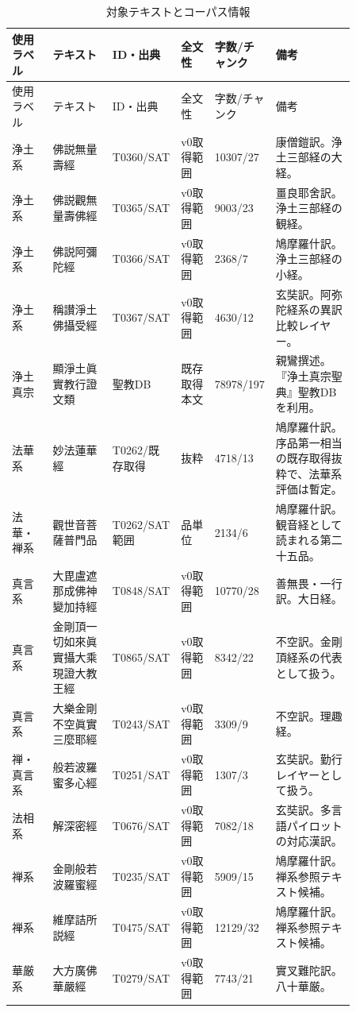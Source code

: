 \documentclass[uplatex,dvipdfmx,11pt,a4paper]{jsarticle}
\begin{document}
{\small
\setlength{\tabcolsep}{3pt}
\begin{longtable}{@{}p{0.12\linewidth}p{0.18\linewidth}p{0.12\linewidth}p{0.10\linewidth}p{0.10\linewidth}p{0.24\linewidth}@{}}
\caption{対象テキストとコーパス情報}\\
\toprule
使用ラベル & テキスト & ID・出典 & 全文性 & 字数/チャンク & 備考 \\
\midrule
\endfirsthead
\toprule
使用ラベル & テキスト & ID・出典 & 全文性 & 字数/チャンク & 備考 \\
\midrule
\endhead
浄土系 & 佛説無量壽經 & T0360/SAT & v0取得範囲 & 10307/27 & 康僧鎧訳。浄土三部経の大経。 \\
浄土系 & 佛説觀無量壽佛經 & T0365/SAT & v0取得範囲 & 9003/23 & 畺良耶舍訳。浄土三部経の観経。 \\
浄土系 & 佛説阿彌陀經 & T0366/SAT & v0取得範囲 & 2368/7 & 鳩摩羅什訳。浄土三部経の小経。 \\
浄土系 & 稱讃淨土佛攝受經 & T0367/SAT & v0取得範囲 & 4630/12 & 玄奘訳。阿弥陀経系の異訳比較レイヤー。 \\
浄土真宗 & 顯淨土眞實教行證文類 & 聖教DB & 既存取得本文 & 78978/197 & 親鸞撰述。『浄土真宗聖典』聖教DBを利用。 \\
法華系 & 妙法蓮華經 & T0262/既存取得 & 抜粋 & 4718/13 & 鳩摩羅什訳。序品第一相当の既存取得抜粋で、法華系評価は暫定。 \\
法華・禅系 & 觀世音菩薩普門品 & T0262/SAT範囲 & 品単位 & 2134/6 & 鳩摩羅什訳。観音経として読まれる第二十五品。 \\
真言系 & 大毘盧遮那成佛神變加持經 & T0848/SAT & v0取得範囲 & 10770/28 & 善無畏・一行訳。大日経。 \\
真言系 & 金剛頂一切如來眞實攝大乘現證大教王經 & T0865/SAT & v0取得範囲 & 8342/22 & 不空訳。金剛頂経系の代表として扱う。 \\
真言系 & 大樂金剛不空眞實三麼耶經 & T0243/SAT & v0取得範囲 & 3309/9 & 不空訳。理趣経。 \\
禅・真言系 & 般若波羅蜜多心經 & T0251/SAT & v0取得範囲 & 1307/3 & 玄奘訳。勤行レイヤーとして扱う。 \\
法相系 & 解深密經 & T0676/SAT & v0取得範囲 & 7082/18 & 玄奘訳。多言語パイロットの対応漢訳。 \\
禅系 & 金剛般若波羅蜜經 & T0235/SAT & v0取得範囲 & 5909/15 & 鳩摩羅什訳。禅系参照テキスト候補。 \\
禅系 & 維摩詰所説經 & T0475/SAT & v0取得範囲 & 12129/32 & 鳩摩羅什訳。禅系参照テキスト候補。 \\
華厳系 & 大方廣佛華嚴經 & T0279/SAT & v0取得範囲 & 7743/21 & 實叉難陀訳。八十華厳。 \\
\bottomrule
\end{longtable}
}
\end{document}
